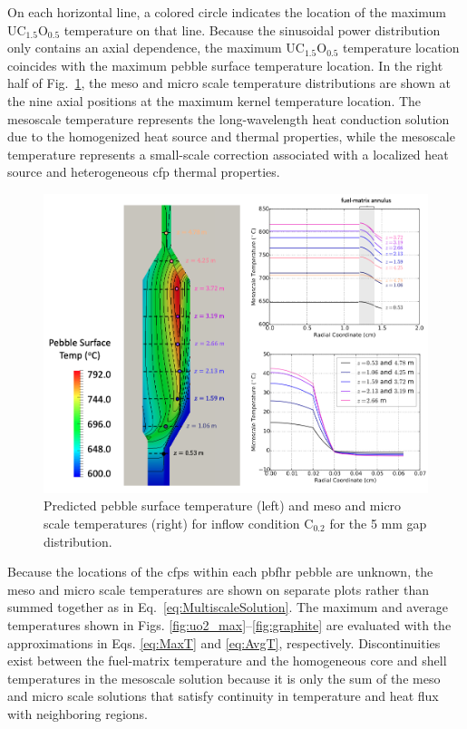 On each horizontal line, a colored circle indicates the location of the maximum UC$_{1.5}$O$_{0.5}$ temperature on that line. Because the sinusoidal power distribution only contains an axial dependence, the maximum UC$_{1.5}$O$_{0.5}$ temperature location coincides with the maximum pebble surface temperature location. In the right half of Fig.\ \ref{fig:multiscale_fuel}, the meso and micro scale temperature distributions are shown at the nine axial positions at the maximum kernel temperature location. The mesoscale temperature represents the long-wavelength heat conduction solution due to the homogenized heat source and thermal properties, while the mesoscale temperature represents a small-scale correction associated with a localized heat source and heterogeneous \gls{cfp} thermal properties. 

\begin{figure}[h!]
\centering
\includegraphics[width=0.9\linewidth]{figs/multiscale_fuel.png}
\caption{Predicted pebble surface temperature (left) and meso and micro scale temperatures (right) for inflow condition C$_\text{0.2}$ for the 5 \si{\milli\meter} gap distribution. }
\label{fig:multiscale_fuel}
\end{figure}

Because the locations of the \glspl{cfp} within each \gls{pbfhr} pebble are unknown, the meso and micro scale temperatures are shown on separate plots rather than summed together as in Eq.\ \eqref{eq:MultiscaleSolution}. The maximum and average temperatures shown in Figs. \ref{fig:uo2_max}--\ref{fig:graphite} are evaluated with the approximations in Eqs. \eqref{eq:MaxT} and \eqref{eq:AvgT}, respectively. Discontinuities exist between the fuel-matrix temperature and the homogeneous core and shell temperatures in the mesoscale solution because it is only the sum of the meso and micro scale solutions that satisfy continuity in temperature and heat flux with neighboring regions.

